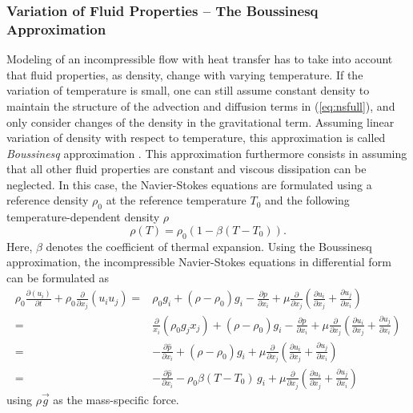 \subsubsection{Variation of Fluid Properties -- The Boussinesq Approximation}
\label{sec:boussinesq}

Modeling of an incompressible flow with heat transfer has to take into account that fluid properties, as density, change with varying temperature. If the variation of temperature is small, one can still assume constant density to maintain the structure of the advection and diffusion terms in (\ref{eq:nsfull}), and only consider changes of the density in the gravitational term. Assuming linear variation of density with respect to temperature, this approximation is called \emph{Boussinesq} approximation \cite{gray76}. This approximation furthermore consists in assuming that all other fluid properties are constant and viscous dissipation can be neglected. In this case, the Navier-Stokes equations are formulated using a reference density \(\rho_0\) at the reference temperature \(T_0\) and the following temperature-dependent density \(\rho\)
\begin{displaymath}
  \rho \left( T \right) = \rho_0 \left( 1 - \beta \left( T - T_0 \right) \right).
\end{displaymath}
Here, \(\beta\) denotes the coefficient of thermal expansion. Using the Boussinesq approximation, the incompressible Navier-Stokes equations in differential form can be formulated as
\begin{align*}
  \rho_0 \frac{\partial \left( u_i \right)}{\partial t} 
  + \rho_0 \frac{\partial}{\partial x_j} \left( u_i  u_j \right) 
  =& \rho_0 g_i + \left(\rho - \rho_0 \right) g_i
  - \frac{\partial p}{\partial x_i}
  +  \mu \frac{\partial}{\partial x_j} \left( \frac{\partial u_i}{\partial x_j} 
  + \frac{\partial u_j}{\partial x_i} \right)  \\[0.5em]
  =& \frac{\partial}{x_i}\left(\rho_0 g_j x_j \right) 
  + \left(\rho - \rho_0 \right) g_i
  - \frac{\partial p}{\partial x_i}
  +  \mu \frac{\partial}{\partial x_j} \left( \frac{\partial u_i}{\partial x_j} 
  + \frac{\partial u_j}{\partial x_i} \right)  \\[0.5em]
  =& - \frac{\partial \hat{p}}{\partial x_i} 
  + \left(\rho - \rho_0 \right) g_i
  +  \mu \frac{\partial}{\partial x_j} \left( \frac{\partial u_i}{\partial x_j} 
  + \frac{\partial u_j}{\partial x_i} \right)  \\[0.5em]
  =& - \frac{\partial \hat{p}}{\partial x_i} 
  - \rho_0 \beta \left( T - T_0 \right) \, g_i
  +  \mu \frac{\partial}{\partial x_j} \left( \frac{\partial u_i}{\partial x_j} 
                                       + \frac{\partial u_j}{\partial x_i} \right) 
\end{align*}
using \(\rho \vec{g}\) as the mass-specific force. 

